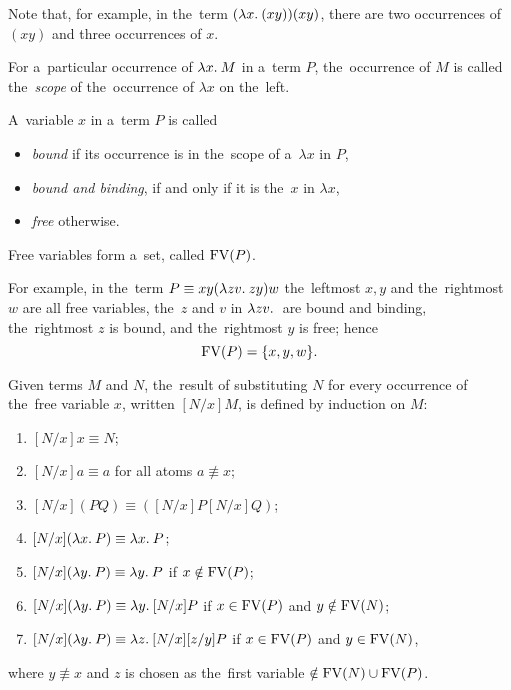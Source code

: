 Note that, for example, in the~term $(\lambda x . \: ( x y)) (x y)$, there are two
occurrences of $(x y)$ and three occurrences of $x$.

\begin{definition}
  For a~particular occurrence of $\lambda x . \: M$ in a~term $P$, the~occurrence of $M$
  is called the~\emph{scope} of the~occurrence of $\lambda x$ on the~left.
\end{definition}

\begin{definition}
  A~variable $x$ in a~term $P$ is called
  \begin{itemize}
    \item \emph{bound} if its occurrence is in the~scope of a~$\lambda x$ in
      $P$,
    \item \emph{bound and binding}, if and only if it is the~$x$ in $\lambda x$,
    \item \emph{free} otherwise.
  \end{itemize}
  Free variables form a~set, called $\mathrm{FV}(P)$.
\end{definition}

For example, in the~term $P \equiv xy(\lambda zv . \: zy)w$ the~leftmost $x, y$ and
the~rightmost $w$ are all free variables, the~$z$ and $v$ in $\lambda zv . \: $ are
bound and binding, the~rightmost $z$ is bound, and the~rightmost $y$ is free;
hence
\[
  \mathrm{FV}(P) = \{x, y, w\} .
\]

\begin{definition}[Substitution]\label{def:substitution}
  Given terms $M$ and $N$, the~result of substituting $N$ for every occurrence
  of the~free variable $x$, written $[N/x]M$, is defined by induction on $M$:
  \begin{enumerate}
    \item $[N/x]x  \equiv N$;
    \item $[N/x]a  \equiv a$  \hfill for all atoms $a \not\equiv x$;
    \item $[N/x](P Q)  \equiv ([N/x]P [N/x]Q)$;
    \item $[N/x](\lambda x . \: P)  \equiv \lambda x . \: P$;
    \item $[N/x](\lambda y . \: P)  \equiv \lambda y . \: P$ \hfill if $x \notin \mathrm{FV}(P)$;
    \item $[N/x](\lambda y . \: P)  \equiv \lambda y . \: [N/x]P$
      \hfill if $x \in \mathrm{FV}(P)$ and $y \notin \mathrm{FV}(N)$;
    \item \label{def:substitution:g_item} $[N/x](\lambda y . \: P)
      \equiv \lambda z . \: [N/x][z/y]P$ \hfill if $x \in \mathrm{FV}(P)$ and $y \in \mathrm{FV}(N)$,
  \end{enumerate}
  where $y \not\equiv x$ and $z$ is chosen as the~first variable $\notin \mathrm{FV}(N)
  \cup \mathrm{FV}(P)$.
\end{definition}

